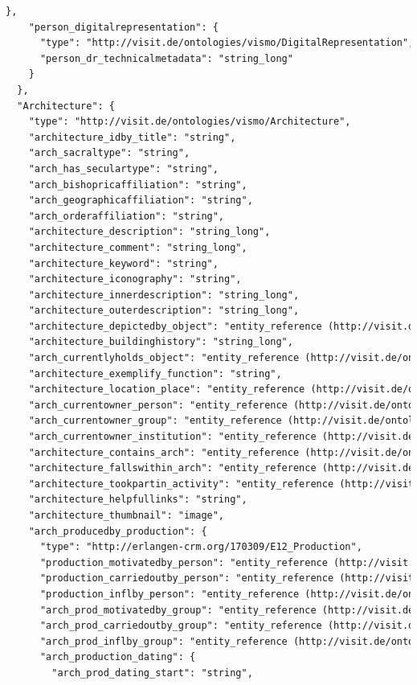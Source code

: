 \begin{lstlisting}[caption={JSON \q{Schema} der ViSIT Daten, die über die REST API ausgespielt werden.},label={lst:json},captionpos=b,language=xml]
    },
    "person_digitalrepresentation": {
      "type": "http://visit.de/ontologies/vismo/DigitalRepresentation",
      "person_dr_technicalmetadata": "string_long"
    }
  },
  "Architecture": {
    "type": "http://visit.de/ontologies/vismo/Architecture",
    "architecture_idby_title": "string",
    "arch_sacraltype": "string",
    "arch_has_seculartype": "string",
    "arch_bishopricaffiliation": "string",
    "arch_geographicaffiliation": "string",
    "arch_orderaffiliation": "string",
    "architecture_description": "string_long",
    "architecture_comment": "string_long",
    "architecture_keyword": "string",
    "architecture_iconography": "string",
    "architecture_innerdescription": "string_long",
    "architecture_outerdescription": "string_long",
    "architecture_depictedby_object": "entity_reference (http://visit.de/ontologies/vismo/Object)",
    "architecture_buildinghistory": "string_long",
    "arch_currentlyholds_object": "entity_reference (http://visit.de/ontologies/vismo/Object)",
    "architecture_exemplify_function": "string",
    "architecture_location_place": "entity_reference (http://visit.de/ontologies/vismo/Place)",
    "arch_currentowner_person": "entity_reference (http://visit.de/ontologies/vismo/Person)",
    "arch_currentowner_group": "entity_reference (http://visit.de/ontologies/vismo/Group)",
    "arch_currentowner_institution": "entity_reference (http://visit.de/ontologies/vismo/Institution)",
    "architecture_contains_arch": "entity_reference (http://visit.de/ontologies/vismo/Architecture)",
    "architecture_fallswithin_arch": "entity_reference (http://visit.de/ontologies/vismo/Architecture)",
    "architecture_tookpartin_activity": "entity_reference (http://visit.de/ontologies/vismo/Activity)",
    "architecture_helpfullinks": "string",
    "architecture_thumbnail": "image",
    "arch_producedby_production": {
      "type": "http://erlangen-crm.org/170309/E12_Production",
      "production_motivatedby_person": "entity_reference (http://visit.de/ontologies/vismo/Person)",
      "production_carriedoutby_person": "entity_reference (http://visit.de/ontologies/vismo/Person)",
      "production_inflby_person": "entity_reference (http://visit.de/ontologies/vismo/Person)",
      "arch_prod_motivatedby_group": "entity_reference (http://visit.de/ontologies/vismo/Group)",
      "arch_prod_carriedoutby_group": "entity_reference (http://visit.de/ontologies/vismo/Group)",
      "arch_prod_inflby_group": "entity_reference (http://visit.de/ontologies/vismo/Group)",
      "arch_production_dating": {
        "arch_prod_dating_start": "string",

\end{lstlisting}

